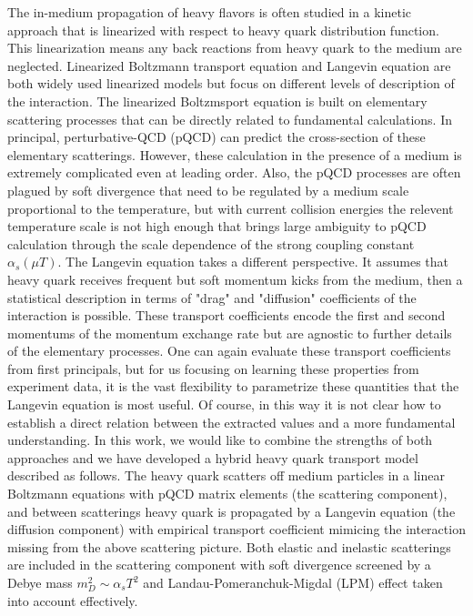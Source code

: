 \documentclass[aps, prc, reprint, amsmath, groupedaddress, nofootinbib]{revtex4-1}
\begin{document}
The in-medium propagation of heavy flavors is often studied in a kinetic approach that is linearized with respect to heavy quark distribution function. 
This linearization means any back reactions from heavy quark to the medium are neglected.
Linearized Boltzmann transport equation and Langevin equation are both widely used linearized models but focus on different levels of description of the interaction.
The linearized Boltzmsport equation is built on elementary scattering processes that can be directly related to fundamental calculations.
In principal, perturbative-QCD (pQCD) can predict the cross-section of these elementary scatterings.
However, these calculation in the presence of a medium is extremely complicated even at leading order.
Also, the pQCD processes are often plagued by soft divergence that need to be regulated by a medium scale proportional to the temperature, but with current collision energies the relevent temperature scale is not high enough that brings large ambiguity to pQCD calculation through the scale dependence of the strong coupling constant $\alpha_s(\mu T)$.
The Langevin equation takes a different perspective. 
It assumes that heavy quark receives frequent but soft momentum kicks from the medium, then a statistical description in terms of "drag" and "diffusion" coefficients of the interaction is possible.
These transport coefficients encode the first and second momentums of the momentum exchange rate but are agnostic to further details of the elementary processes.
One can again evaluate these transport coefficients from first principals, but for us focusing on learning these properties from experiment data, it is the vast flexibility to parametrize these quantities that the Langevin equation is most useful.
Of course, in this way it is not clear how to establish a direct relation between the extracted values and a more fundamental understanding.
In this work, we would like to combine the strengths of both approaches
and we have developed a hybrid heavy quark transport model described as follows.
The heavy quark scatters off medium particles in a linear Boltzmann equations with pQCD matrix elements (the scattering component), and between scatterings heavy quark is propagated by a Langevin equation (the diffusion component) with empirical transport coefficient mimicing the interaction missing from the above scattering picture.
Both elastic and inelastic scatterings are included in the scattering component with soft divergence screened by a Debye mass $m_D^2 \sim \alpha_s T^2$ and Landau-Pomeranchuk-Migdal (LPM) effect taken into account effectively.
\end{document}
